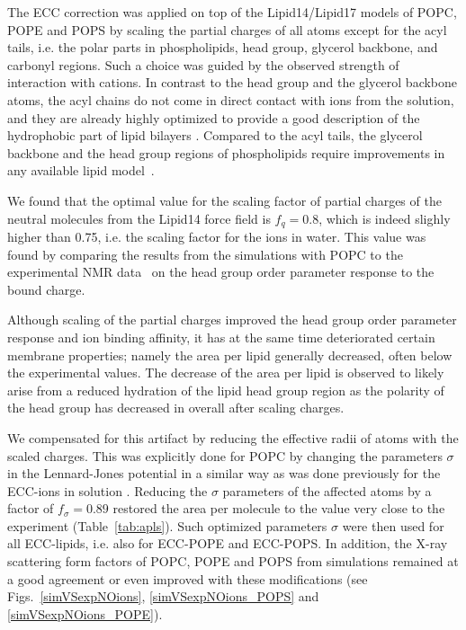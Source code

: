 The ECC correction was applied on top of the Lipid14/Lipid17 models of POPC, POPE and POPS
by scaling the partial charges of all atoms except for the acyl tails, 
i.e. the polar parts in phospholipids, head group, glycerol backbone, and carbonyl regions. 
Such a choice was guided by the observed strength of interaction with cations. 
In contrast to the head group and the glycerol backbone atoms, 
the acyl chains do not come in direct contact with ions from the solution, 
and they are already highly optimized to provide a good description of the
hydrophobic part of lipid bilayers \cite{dickson14, ollila16, Pluhackova2016}.
Compared to the acyl tails, the glycerol backbone and the head group regions of phospholipids 
require improvements in any available lipid model~\cite{botan15}.

We found that the optimal value  for the scaling factor of partial charges of the neutral molecules from the Lipid14 force field \citep{dickson14}
is $f_q = 0.8$, which is indeed slighly higher than 0.75, 
i.e. the scaling factor for the ions in water. 
This value was found by comparing the results from the simulations with POPC to the experimental 
NMR data~\cite{akutsu81,altenbach84,scherer89} on the head group order parameter response to the bound charge.

Although scaling of the partial charges improved 
the head group order parameter response and ion binding affinity,
it has at the same time deteriorated certain membrane properties; 
namely the area per lipid generally decreased, often below the experimental values. 
The decrease of the area per lipid is observed to likely arise from a reduced hydration of the lipid head group region
as the polarity of the head group has decreased in overall after scaling charges. 

We compensated for this artifact
by reducing the effective radii of atoms with the scaled charges.
This was explicitly done for POPC by changing the parameters $\sigma$ in the Lennard-Jones potential 
in a similar way as was done previously for the ECC-ions in solution \cite{kohagen14,kohagen16,Pluharova2014}.
Reducing the $\sigma$ parameters of the affected atoms by a factor of $f_\sigma = 0.89$
restored the area per molecule to the value very close to the experiment (Table~\ref{tab:apls}). 
Such optimized parameters $\sigma$ were then used for all ECC-lipids, i.e. also for ECC-POPE and ECC-POPS. 
In addition, the X-ray scattering form factors of POPC, POPE and POPS from simulations remained at a good agreement or even improved with these modifications 
(see Figs.~\ref{simVSexpNOions}, \ref{simVSexpNOions_POPS} and \ref{simVSexpNOions_POPE}). 








